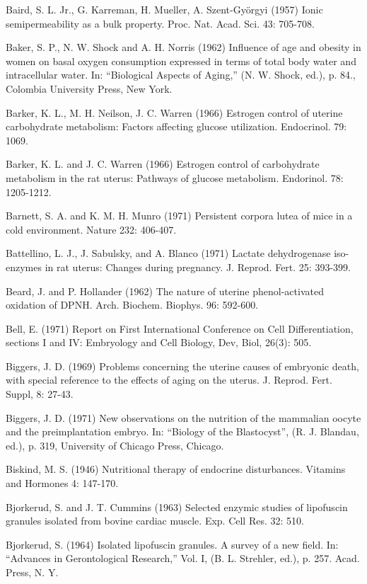 Baird, S. L. Jr., G. Karreman, H. Mueller, A. Szent-Györgyi (1957) Ionic semipermeability as a bulk property. Proc. Nat. Acad. Sci. 43: 705-708.

Baker, S. P., N. W. Shock and A. H. Norris (1962) Influence of age and obesity in women on basal oxygen consumption expressed in terms of total body water and intracellular water. In: ``Biological Aspects of Aging,'' (N. W. Shock, ed.), p. 84., Colombia University Press, New York.

Barker, K. L., M. H. Neilson, J. C. Warren (1966) Estrogen control of uterine carbohydrate metabolism: Factors affecting glucose utilization. Endocrinol. 79: 1069.

Barker, K. L. and J. C. Warren (1966) Estrogen control of carbohydrate metabolism in the rat uterus: Pathways of glucose metabolism. Endorinol. 78: 1205-1212.

Barnett, S. A. and K. M. H. Munro (1971) Persistent corpora lutea of mice in a cold environment. Nature 232: 406-407.

Battellino, L. J., J. Sabulsky, and A. Blanco (1971) Lactate dehydrogenase iso-enzymes in rat uterus: Changes during pregnancy. J. Reprod. Fert. 25: 393-399.

Beard, J. and P. Hollander (1962) The nature of uterine phenol-activated oxidation of DPNH. Arch. Biochem. Biophys. 96: 592-600.

Bell, E. (1971) Report on First International Conference on Cell Differentiation, sections I and IV: Embryology and Cell Biology, Dev, Biol, 26(3): 505.

Biggers, J. D. (1969) Problems concerning the uterine causes of embryonic death, with special reference to the effects of aging on the uterus. J. Reprod. Fert. Suppl, 8: 27-43.

Biggers, J. D. (1971) New observations on the nutrition of the mammalian oocyte and the preimplantation embryo. In: ``Biology of the Blastocyst'', (R. J. Blandau, ed.), p. 319, University of Chicago Press, Chicago.


Biskind, M. S. (1946) Nutritional therapy of endocrine disturbances. Vitamins and Hormones 4: 147-170.

Bjorkerud, S. and J. T. Cummins (1963) Selected enzymic studies of lipofuscin granules isolated from bovine cardiac muscle. Exp. Cell Res. 32: 510.

Bjorkerud, S. (1964) Isolated lipofuscin granules. A survey of a new field. In: ``Advances in Gerontological Research,'' Vol. I, (B. L. Strehler, ed.), p. 257. Acad. Press, N. Y.

